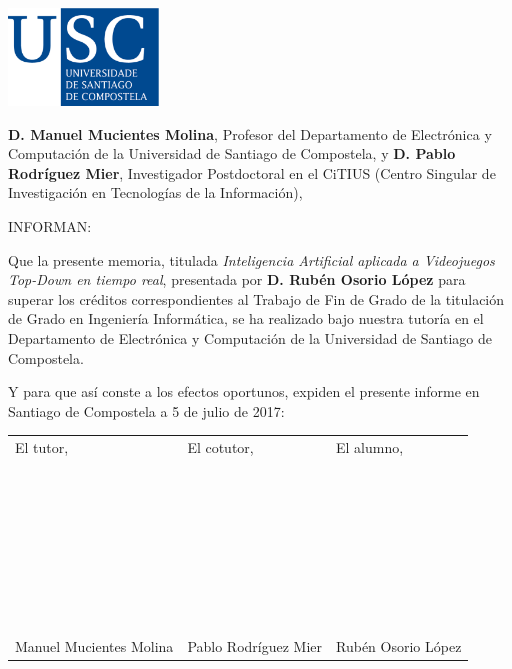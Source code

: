 \pagestyle{plain}
\includegraphics[width=4cm]{figuras/logo_usc.eps}

\vspace{1cm}
{\bf D. Manuel Mucientes Molina}, Profesor del Departamento de Electrónica y Computación de la Universidad de Santiago de Compostela, y {\bf D. Pablo Rodríguez Mier}, Investigador Postdoctoral en el CiTIUS (Centro Singular de Investigación en Tecnologías de la Información),

\vspace{1cm}
INFORMAN:

\vspace{1cm}
Que la presente memoria, titulada {\it Inteligencia Artificial aplicada a Videojuegos Top-Down en tiempo real}, presentada por {\bf D. Rubén Osorio López} para superar los créditos correspondientes al Trabajo de Fin de Grado de la titulación de Grado en Ingeniería Informática, se ha realizado bajo nuestra tutoría en el Departamento de Electrónica y Computación de la Universidad de Santiago de Compostela.

\vspace{1cm}
Y para que así conste a los efectos oportunos, expiden el presente informe en Santiago de Compostela a 5 de julio de 2017:

\vspace{2cm}
\begin{tabular}{lll}
El tutor, & El cotutor, & El alumno, \\
~ \\
~ \\
~ \\
~ \\
~ \\
~ \\
~ \\
Manuel Mucientes Molina & Pablo Rodríguez Mier & Rubén Osorio López
\end{tabular}

